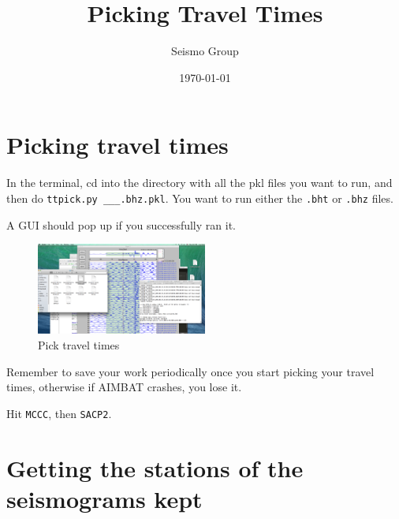 \documentclass[letterpaper,10pt]{article}
\title{Picking Travel Times}
\author{Seismo Group}
\date{\today}
\begin{document}
\maketitle


\section{Picking travel times}

In the terminal, cd into the directory with all the pkl files you want to run, and then do \verb"ttpick.py ___.bhz.pkl". You want to run either the \verb".bht" or \verb".bhz" files. 

A GUI should pop up if you successfully ran it.  

\begin{figure}[h!]
  \centering
  \includegraphics[width=0.5\textwidth]{images/pick_travel_times}
  \caption{Pick travel times}
  \label{fig:pick_travel_times}
\end{figure}

Remember to save your work periodically once you start picking your travel times, otherwise if AIMBAT crashes, you lose it. 

Hit \verb"MCCC", then \verb"SACP2". 

\section{Getting the stations of the seismograms kept}


\end{document}
